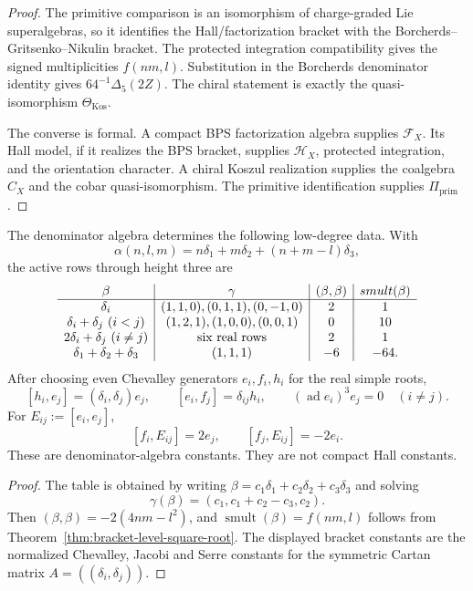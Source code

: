 \documentclass[11pt]{memoir}
\newcommand{\smult}{\operatorname{smult}}
\begin{document}
\begin{proof}
The primitive comparison is an isomorphism of charge-graded Lie
superalgebras, so it identifies the Hall/factorization bracket with the
Borcherds--Gritsenko--Nikulin bracket.  The protected integration
compatibility gives the signed multiplicities \(f(nm,l)\).  Substitution
in the Borcherds denominator identity gives
\(64^{-1}\Delta_5(2Z)\).  The chiral statement is exactly the
quasi-isomorphism \(\Theta_{\mathrm{Kos}}\).

The converse is formal.  A compact BPS factorization algebra supplies
\(\mathcal F_X\).  Its Hall model, if it realizes the BPS bracket,
supplies \(\mathcal H_X\), protected integration, and the orientation
character.  A chiral Koszul realization supplies the coalgebra \(C_X\)
and the cobar quasi-isomorphism.  The primitive identification supplies
\(\Pi_{\mathrm{prim}}\).
\end{proof}

\begin{proposition}
\label{prop:low-degree-denominator-brackets}
The denominator algebra determines the following low-degree data.  With
$$
\alpha(n,l,m)=n\delta_1+m\delta_2+(n+m-l)\delta_3,
$$
the active rows through height three are
$$
\begin{array}{c|c|c|c}
\beta & \gamma & (\beta,\beta) & \smult(\beta)\\ \hline
\delta_i & (1,1,0),(0,1,1),(0,-1,0) & 2 & 1\\
\delta_i+\delta_j\ (i<j) & (1,2,1),(1,0,0),(0,0,1) & 0 & 10\\
2\delta_i+\delta_j\ (i\ne j) & \hbox{six real rows} & 2 & 1\\
\delta_1+\delta_2+\delta_3 & (1,1,1) & -6 & -64 .
\end{array}
$$
After choosing even Chevalley generators \(e_i,f_i,h_i\) for the real
simple roots,
$$
[h_i,e_j]=(\delta_i,\delta_j)e_j,\qquad
[e_i,f_j]=\delta_{ij}h_i,\qquad
(\operatorname{ad}e_i)^3e_j=0\quad(i\ne j).
$$
For \(E_{ij}:=[e_i,e_j]\),
$$
[f_i,E_{ij}]=2e_j,\qquad [f_j,E_{ij}]=-2e_i.
$$
These are denominator-algebra constants.  They are not compact Hall
constants.
\end{proposition}

\begin{proof}
The table is obtained by writing
\(\beta=c_1\delta_1+c_2\delta_2+c_3\delta_3\) and solving
$$
\gamma(\beta)=(c_1,c_1+c_2-c_3,c_2).
$$
Then \((\beta,\beta)=-2(4nm-l^2)\), and
\(\smult(\beta)=f(nm,l)\) follows from
Theorem~\ref{thm:bracket-level-square-root}.  The displayed bracket
constants are the normalized Chevalley, Jacobi and Serre constants for
the symmetric Cartan matrix \(A=((\delta_i,\delta_j))\).
\end{proof}
\end{document}
